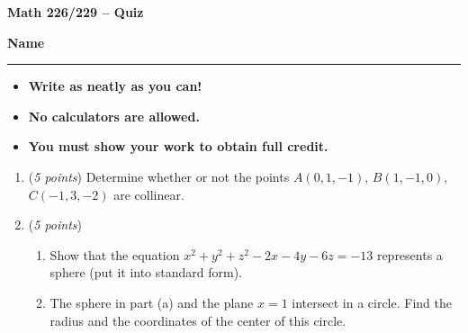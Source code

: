 \documentclass[12 pt]{article}
\begin{document}
  \begin{center}
    \textbf{\hfill Math 226/229 -- Quiz} \\
  \end{center}
  \medskip

  \noindent
  \textbf{Name}\ \rule{3.5in}{.4pt} \hfill
  \vspace{.1in}
  \hspace*{0.2in}
  \begin{itemize}
    \item \textbf{Write as neatly as you can!}
    \item \textbf{No calculators are allowed.}
    \item \textbf{You must show your work to obtain full credit.}
  \end{itemize}

	\medskip
  \noindent

  \begin{enumerate}
    \item (\textit{5 points})
    Determine whether or not the points $A(0,1,-1)$, $B(1,-1,0)$, $C(-1,3,-2)$
		are collinear.

		\vspace{3in}
		\item (\textit{5 points})
		\begin{enumerate}
			\item Show that the equation $x^2+y^2+z^2-2x-4y-6z = -13$ represents a
			sphere (put it into standard form).
			\item The sphere in part (a) and the plane $x=1$ intersect in a circle.
			Find the radius and the coordinates of the center of this circle.
		\end{enumerate}
  \end{enumerate}
\end{document}

